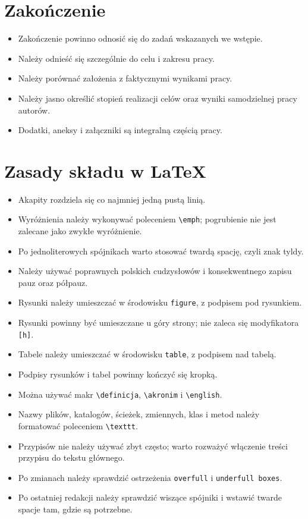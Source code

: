 \section*{Zakończenie}
\begin{itemize}
    \item Zakończenie powinno odnosić się do zadań wskazanych we wstępie.
    \item Należy odnieść się szczególnie do celu i zakresu pracy.
    \item Należy porównać założenia z faktycznymi wynikami pracy.
    \item Należy jasno określić stopień realizacji celów oraz wyniki samodzielnej pracy autorów.
    \item Dodatki, aneksy i załączniki są integralną częścią pracy.
\end{itemize}

\section*{Zasady składu w LaTeX}
\begin{itemize}
    \item Akapity rozdziela się co najmniej jedną pustą linią.
    \item Wyróżnienia należy wykonywać poleceniem \texttt{\textbackslash emph}; pogrubienie nie jest zalecane jako zwykłe wyróżnienie.
    \item Po jednoliterowych spójnikach warto stosować twardą spację, czyli znak tyldy.
    \item Należy używać poprawnych polskich cudzysłowów i konsekwentnego zapisu pauz oraz półpauz.
    \item Rysunki należy umieszczać w środowisku \texttt{figure}, z podpisem pod rysunkiem.
    \item Rysunki powinny być umieszczane u góry strony; nie zaleca się modyfikatora \texttt{[h]}.
    \item Tabele należy umieszczać w środowisku \texttt{table}, z podpisem nad tabelą.
    \item Podpisy rysunków i tabel powinny kończyć się kropką.
    \item Można używać makr \texttt{\textbackslash definicja}, \texttt{\textbackslash akronim} i \texttt{\textbackslash english}.
    \item Nazwy plików, katalogów, ścieżek, zmiennych, klas i metod należy formatować poleceniem \texttt{\textbackslash texttt}.
    \item Przypisów nie należy używać zbyt często; warto rozważyć włączenie treści przypisu do tekstu głównego.
    \item Po zmianach należy sprawdzić ostrzeżenia \texttt{overfull} i \texttt{underfull boxes}.
    \item Po ostatniej redakcji należy sprawdzić wiszące spójniki i wstawić twarde spacje tam, gdzie są potrzebne.
\end{itemize}
